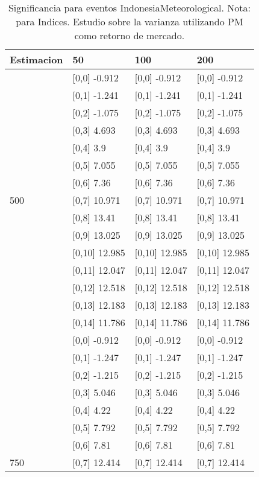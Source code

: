 \begin{table}

\caption{Significancia para eventos IndonesiaMeteorological. Nota: para Indices. Estudio sobre la varianza utilizando PM como retorno de mercado.}
\centering
\begin{tabular}[t]{llll}
\toprule
Estimacion & 50 & 100 & 200\\
\midrule
 & {}[0,0] -0.912 & {}[0,0] -0.912 & {}[0,0] -0.912\\
 & {}[0,1] -1.241 & {}[0,1] -1.241 & {}[0,1] -1.241\\
 & {}[0,2] -1.075 & {}[0,2] -1.075 & {}[0,2] -1.075\\
 & {}[0,3] 4.693 & {}[0,3] 4.693 & {}[0,3] 4.693\\
 & {}[0,4] 3.9 & {}[0,4] 3.9 & {}[0,4] 3.9\\
\addlinespace
 & {}[0,5] 7.055 & {}[0,5] 7.055 & {}[0,5] 7.055\\
 & {}[0,6] 7.36 & {}[0,6] 7.36 & {}[0,6] 7.36\\
500 & {}[0,7] 10.971 & {}[0,7] 10.971 & {}[0,7] 10.971\\
 & {}[0,8] 13.41 & {}[0,8] 13.41 & {}[0,8] 13.41\\
 & {}[0,9] 13.025 & {}[0,9] 13.025 & {}[0,9] 13.025\\
\addlinespace
 & {}[0,10] 12.985 & {}[0,10] 12.985 & {}[0,10] 12.985\\
 & {}[0,11] 12.047 & {}[0,11] 12.047 & {}[0,11] 12.047\\
 & {}[0,12] 12.518 & {}[0,12] 12.518 & {}[0,12] 12.518\\
 & {}[0,13] 12.183 & {}[0,13] 12.183 & {}[0,13] 12.183\\
 & {}[0,14] 11.786 & {}[0,14] 11.786 & {}[0,14] 11.786\\
\addlinespace
 & {}[0,0] -0.912 & {}[0,0] -0.912 & {}[0,0] -0.912\\
 & {}[0,1] -1.247 & {}[0,1] -1.247 & {}[0,1] -1.247\\
 & {}[0,2] -1.215 & {}[0,2] -1.215 & {}[0,2] -1.215\\
 & {}[0,3] 5.046 & {}[0,3] 5.046 & {}[0,3] 5.046\\
 & {}[0,4] 4.22 & {}[0,4] 4.22 & {}[0,4] 4.22\\
\addlinespace
 & {}[0,5] 7.792 & {}[0,5] 7.792 & {}[0,5] 7.792\\
 & {}[0,6] 7.81 & {}[0,6] 7.81 & {}[0,6] 7.81\\
750 & {}[0,7] 12.414 & {}[0,7] 12.414 & {}[0,7] 12.414\\

\end{tabular}
\end{table}
